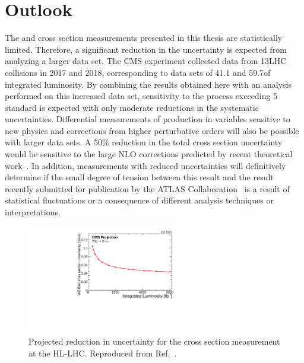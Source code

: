 \section{Outlook}

The \WZjj and \EWWZ cross section measurements 
presented in this thesis are statistically limited.
Therefore, a significant reduction in the uncertainty is expected from
analyzing a larger data set. The CMS experiment collected data from
13\TeV LHC collisions in 2017 and 2018, corresponding to data sets
of 41.1 and 59.7\fbinv of integrated luminosity.
By combining the results obtained here with
an analysis performed on this increased data set, sensitivity to the \EWWZ process
exceeding 5 standard is expected with only moderate
reductions in the systematic uncertainties. Differential measurements
of \WZjj production in variables sensitive to new physics and corrections from higher 
perturbative orders will also be possible with larger data sets.
A 50\% reduction in the total cross section uncertainty would be sensitive
to the large NLO \EW corrections predicted by recent theoretical work~\cite{Denner:2019tmn}.
In addition, measurements with reduced uncertainties will definitively determine 
if the small degree of tension between this result and the result
recently submitted for publication by the ATLAS 
Collaboration~\cite{Aaboud:2018ddq} is a result
of statistical fluctuations or a consequence of different analysis
techniques or interpretations.

\begin{figure}[htbp]
  \centering
   \includegraphics[width=0.6\textwidth]{figures/Conclusions/WZjjSignficanceHLLHC.pdf}
  \caption[Projected reduction in uncertainty for the \EWWZ cross section measurement at the HL-LHC]{
    Projected reduction in uncertainty for the \EWWZ cross section measurement 
    at the HL-LHC. Reproduced from Ref.~\cite{CMS-PAS-FTR-18-038}.
        }
 \label{fig:WZHLLHC}
\end{figure}

